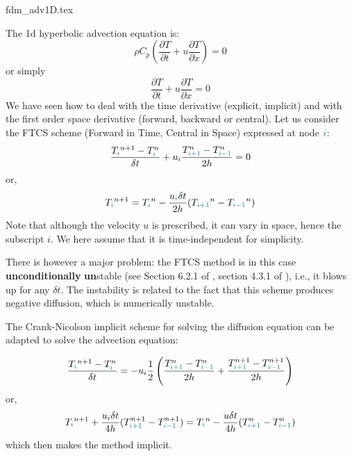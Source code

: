 \begin{flushright} {\tiny {\color{gray} fdm\_adv1D.tex}} \end{flushright}

%


The 1d hyperbolic advection equation is:
\begin{equation}
\rho C_p \left( \frac{\partial T}{\partial t}  
+ u \frac{\partial T}{\partial x} \right)=0 
\end{equation}
or simply
\begin{equation}
\frac{\partial T}{\partial t} + u \frac{\partial T}{\partial x}=0 
\end{equation}
We have seen how to deal with the time derivative (explicit, implicit) 
and with the first order space derivative (forward, backward or central).
Let us consider the FTCS scheme (Forward in Time, Central in Space) expressed 
at node ${\color{teal}i}$:
\[
\frac{T_{\color{teal}i}^{n+1}-T^n_{\color{teal}i}}{\delta t} 
+ u_i \frac{T^n_{\color{teal}i+1} - T^n_{{\color{teal}i-1}}}{2h} =0 
\]
or,
\[
T_{\color{teal}i}^{n+1} = T_{\color{teal}i}^n - \frac{u_{\color{teal}i} \delta t}{2 h} 
(T_{\color{teal} i+1}^n-T_{\color{teal} i-1}^n)
\]
Note that although the velocity $u$ is prescribed, it can vary in space, hence
the subscript $i$. We here assume that it is time-independent for simplicity.

There is however a major problem: 
the FTCS method is in this case {\bf unconditionally} {\bf un}stable (see Section 6.2.1 
of \textcite{hoch}, section 4.3.1 of \textcite{pell08}), i.e., it blows up for any $\delta t$.
The instability is related to the fact that this scheme produces negative diffusion, 
which is numerically unstable.

The Crank-Nicolson implicit scheme for solving the diffusion equation 
can be adapted to solve the advection equation:

\[
\frac{T_{\color{teal}i}^{n+1}-T^n_{\color{teal}i}}{\delta t} 
=- u_i 
\frac12 \left(
\frac{T^n_{\color{teal}i+1} - T^n_{{\color{teal}i-1}}}{2h} 
+
\frac{T^{n+1}_{\color{teal}i+1} - T^{n+1}_{{\color{teal}i-1}}}{2h} 
\right)
\]
or,
\[
T_{\color{teal}i}^{n+1} + \frac{u_i \delta t}{4h} (T_{{\color{teal}i+1}}^{n+1}-T_{{\color{teal}i-1}}^{n+1}) 
= T_{\color{teal}i}^n - \frac{u \delta t}{4h} (T_{{\color{teal}i+1}}^{n}-T_{{\color{teal}i-1}}^{n}) 
\]
which then makes the method implicit.








